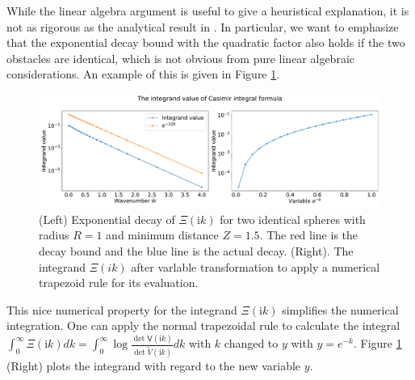While the linear algebra argument is useful to give a heuristical explanation, it is not as rigorous as the analytical result in \cite{fang2022trace}. In particular, we want to emphasize that the exponential decay bound with the quadratic factor also holds if the two obstacles are identical, which is not obvious from pure linear algebraic considerations. An example of this is given in Figure \ref{The integrand decays exponentially}.

\begin{figure}[H]
    \centering
    \hspace*{-1cm}\includegraphics[scale = 0.4]{figures/integ_exp_decay.pdf}
    \caption{(Left) Exponential decay of $\Xi(\textrm{i}k)$ for two identical spheres with radius $R=1$ and minimum distance $Z=1.5$. The red line is the decay bound and the blue line is the actual decay. (Right). The integrand $\Xi(ik)$ after varlable transformation to apply a numerical trapezoid rule for its evaluation.}
    \label{The integrand decays exponentially}
\end{figure}

This nice numerical property for the integrand $\Xi(\mathrm{i}k)$  simplifies the numerical integration. One can apply the normal trapezoidal rule to calculate the integral 
$\int_{0}^{\infty}\Xi(\mathrm{i}k)dk = \int_{0}^{\infty}\log\frac{\det\mathsf{V}(\mathrm{i}k)}{\det\tilde{V}(\mathrm{i}k)}dk$ with $k$ changed to $y$ with $y = e^{-k}$. 
Figure \ref{The integrand decays exponentially} (Right) plots the integrand with regard to the new variable $y$.


